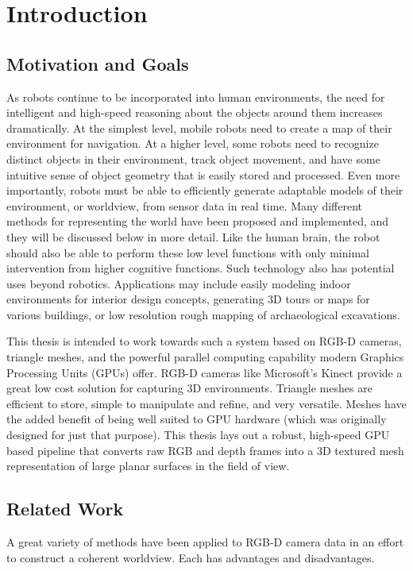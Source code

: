 \chapter{Introduction} %
\section{Motivation and Goals}
As robots continue to be incorporated into human environments, the need for intelligent and high-speed reasoning about the objects around them increases dramatically. At the simplest level, mobile robots need to create a map of their environment for navigation. At a higher level, some robots need to recognize distinct objects in their environment, track object movement, and have some intuitive sense of object geometry that is easily stored and processed. Even more importantly, robots must be able to efficiently generate adaptable models of their environment, or worldview, from sensor data in real time. Many different methods for representing the world have been proposed and implemented, and they will be discussed below in more detail. Like the human brain, the robot should also be able to perform these low level functions with only minimal intervention from higher cognitive functions. Such technology also has potential uses beyond robotics. Applications may include easily modeling indoor environments for interior design concepts, generating 3D tours or maps for various buildings, or low resolution rough mapping of archaeological excavations.\par
This thesis is intended to work towards such a system based on RGB-D cameras, triangle meshes, and the powerful parallel computing capability modern Graphics Processing Units (GPUs) offer. RGB-D cameras like Microsoft's Kinect provide a great low cost solution for capturing 3D environments. Triangle meshes are efficient to store, simple to manipulate and refine, and very versatile. Meshes have the added benefit of being well suited to GPU hardware (which was originally designed for just that purpose). This thesis lays out a robust, high-speed GPU based pipeline that converts raw RGB and depth frames into a 3D textured mesh representation of large planar surfaces in the field of view.
\section{Related Work} %
A great variety of methods have been applied to RGB-D camera data in an effort to construct a coherent worldview. Each has advantages and disadvantages.
